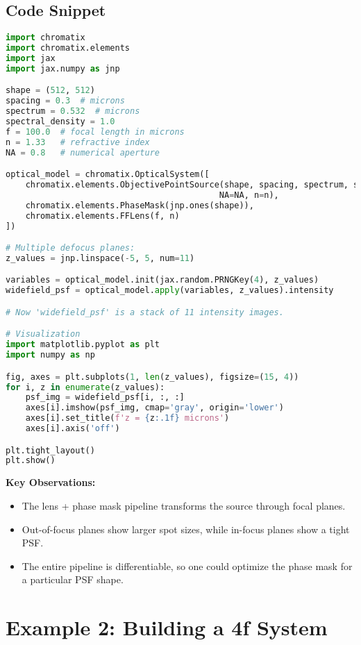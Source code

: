 \documentclass[a4paper,12pt]{report}
\begin{document}
\subsection{Code Snippet}
\begin{lstlisting}[language=Python]
import chromatix
import chromatix.elements
import jax
import jax.numpy as jnp

shape = (512, 512)
spacing = 0.3  # microns
spectrum = 0.532  # microns
spectral_density = 1.0
f = 100.0  # focal length in microns
n = 1.33   # refractive index
NA = 0.8   # numerical aperture

optical_model = chromatix.OpticalSystem([
    chromatix.elements.ObjectivePointSource(shape, spacing, spectrum, spectral_density,
                                           NA=NA, n=n),
    chromatix.elements.PhaseMask(jnp.ones(shape)),
    chromatix.elements.FFLens(f, n)
])

# Multiple defocus planes:
z_values = jnp.linspace(-5, 5, num=11)

variables = optical_model.init(jax.random.PRNGKey(4), z_values)
widefield_psf = optical_model.apply(variables, z_values).intensity

# Now 'widefield_psf' is a stack of 11 intensity images.

# Visualization
import matplotlib.pyplot as plt
import numpy as np

fig, axes = plt.subplots(1, len(z_values), figsize=(15, 4))
for i, z in enumerate(z_values):
    psf_img = widefield_psf[i, :, :]
    axes[i].imshow(psf_img, cmap='gray', origin='lower')
    axes[i].set_title(f'z = {z:.1f} microns')
    axes[i].axis('off')

plt.tight_layout()
plt.show()
\end{lstlisting}
\noindent \textbf{Key Observations:}
\begin{itemize}
    \item The lens + phase mask pipeline transforms the source through focal planes.
    \item Out-of-focus planes show larger spot sizes, while in-focus planes show a tight PSF.
    \item The entire pipeline is differentiable, so one could optimize the phase mask for a particular PSF shape.
\end{itemize}

\section{Example 2: Building a 4f System}
\end{document}
